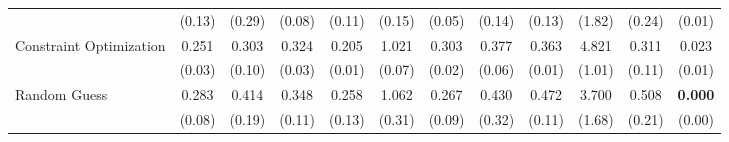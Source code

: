 \begin{table}[ht]
{\begin{tabular}{l cccc cccc cc c}
             & (0.13) & (0.29) & (0.08) & (0.11) & (0.15) & (0.05) & (0.14) & (0.13) & (1.82) & (0.24) & (0.01) \\
            \addlinespace[0.2em]
            Constraint Optimization & 0.251 & 0.303 & 0.324 & 0.205 & 1.021 & 0.303 & 0.377 & 0.363 & 4.821 & 0.311 & 0.023 \\
             & (0.03) & (0.10) & (0.03) & (0.01) & (0.07) & (0.02) & (0.06) & (0.01) & (1.01) & (0.11) & (0.01) \\
            \addlinespace[0.2em]
            Random Guess & 0.283 & 0.414 & 0.348 & 0.258 & 1.062 & 0.267 & 0.430 & 0.472 & 3.700 & 0.508 & \textbf{0.000} \\
             & (0.08) & (0.19) & (0.11) & (0.13) & (0.31) & (0.09) & (0.32) & (0.11) & (1.68) & (0.21) & (0.00) \\
            \bottomrule
        \end{tabular}%
    }
\end{table}